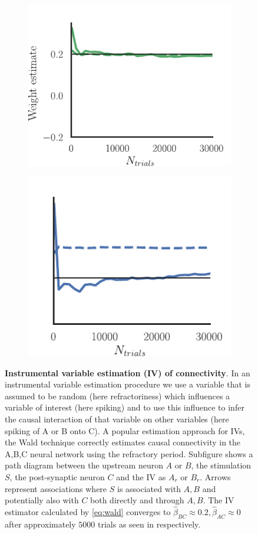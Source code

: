 \documentclass[11pt]{article}
\begin{document}
\begin{figure}
\begin{subfigure}{0.485\textwidth} 
\includegraphics[scale=1]{wald_BC}
\caption{} \label{fig:cchvswald:1}
\end{subfigure}\hfill
\begin{subfigure}{0.485\textwidth} 
\includegraphics[scale=1]{wald_AC}
\caption{} \label{fig:cchvswald:2}
\end{subfigure}
\caption{{\bf Instrumental variable estimation (IV) of connectivity}.  In an instrumental variable estimation procedure we use a variable that is assumed to be random (here refractoriness) which influences a variable of interest (here spiking) and to use this influence to infer the causal interaction of that variable on other variables (here spiking of A or B onto C).  A popular estimation approach for IVs,  the Wald technique correctly estimates causal connectivity in the A,B,C neural network using the refractory period. Subfigure  shows a path diagram \citep{wright1921correlation} between the upstream neuron $ A $ or $ B $, the stimulation $ S $, the post-synaptic neuron $ C $ and the IV as $ A_{r} $ or $ B_{r} $. Arrows represent associations where $ S $ is associated with $ A,B $ and potentially also with $ C $ both directly and through $ A,B $. The IV estimator calculated by \cref{eq:wald} converges to $ \hat{\beta}_{BC} \approx 0.2, \hat{\beta}_{AC} \approx 0 $ after approximately $ 5000 $ trials as seen in  respectively. 
 \label{fig:cchvswald}}
\end{figure}
\FloatBarrier
\end{document}

